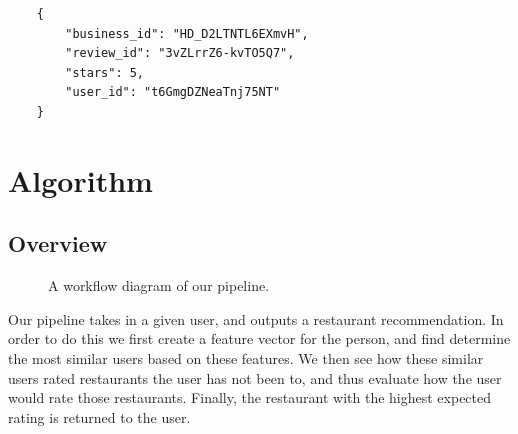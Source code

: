 \documentclass[10pt,twocolumn,letterpaper]{article}
\begin{document}
\begin{verbatim}
	{
	    "business_id": "HD_D2LTNTL6EXmvH",
	    "review_id": "3vZLrrZ6-kvTO5Q7",
	    "stars": 5,
	    "user_id": "t6GmgDZNeaTnj75NT"
	}
\end{verbatim}


\section{Algorithm}

\subsection{Overview}
\begin{figure}[t]
\begin{center}
\end{center}
   \caption{A workflow diagram of our pipeline.}
\label{fig:long}
\label{fig:onecol}
\end{figure}

Our pipeline takes in a given user, and outputs a restaurant recommendation. In order to do this we first create a feature vector for the person, and find determine the most similar users based on these features. We then see how these similar users rated restaurants the user has not been to, and thus evaluate how the user would rate those restaurants. Finally, the restaurant with the highest expected rating is returned to the user.
\end{document}
